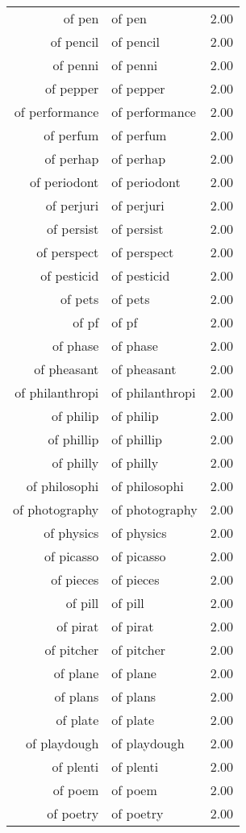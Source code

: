 \begin{table}[ht]
\begin{tabular}{rlr}
  of pen & of pen & 2.00 \\ 
  of pencil & of pencil & 2.00 \\ 
  of penni & of penni & 2.00 \\ 
  of pepper & of pepper & 2.00 \\ 
  of performance & of performance & 2.00 \\ 
  of perfum & of perfum & 2.00 \\ 
  of perhap & of perhap & 2.00 \\ 
  of periodont & of periodont & 2.00 \\ 
  of perjuri & of perjuri & 2.00 \\ 
  of persist & of persist & 2.00 \\ 
  of perspect & of perspect & 2.00 \\ 
  of pesticid & of pesticid & 2.00 \\ 
  of pets & of pets & 2.00 \\ 
  of pf & of pf & 2.00 \\ 
  of phase & of phase & 2.00 \\ 
  of pheasant & of pheasant & 2.00 \\ 
  of philanthropi & of philanthropi & 2.00 \\ 
  of philip & of philip & 2.00 \\ 
  of phillip & of phillip & 2.00 \\ 
  of philly & of philly & 2.00 \\ 
  of philosophi & of philosophi & 2.00 \\ 
  of photography & of photography & 2.00 \\ 
  of physics & of physics & 2.00 \\ 
  of picasso & of picasso & 2.00 \\ 
  of pieces & of pieces & 2.00 \\ 
  of pill & of pill & 2.00 \\ 
  of pirat & of pirat & 2.00 \\ 
  of pitcher & of pitcher & 2.00 \\ 
  of plane & of plane & 2.00 \\ 
  of plans & of plans & 2.00 \\ 
  of plate & of plate & 2.00 \\ 
  of playdough & of playdough & 2.00 \\ 
  of plenti & of plenti & 2.00 \\ 
  of poem & of poem & 2.00 \\ 
  of poetry & of poetry & 2.00 \\ 

\end{tabular}
\end{table}
